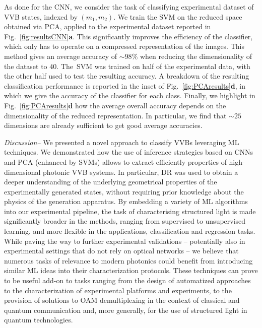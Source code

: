 \documentclass[
	aps, prl, superscriptaddress, twocolumn,
	10pt
	floatfix, 
    nofootinbib,
	tightenlines
]{revtex4-1}
\begin{document}
As done for the CNN, we consider the task of classifying experimental dataset of \ac{VVB} states, indexed by $(m_1,m_2)$. 
We train the \ac{SVM} on the reduced space obtained via {\ac{PCA}}, applied to the experimental dataset reported in Fig.~\ref{fig:resultsCNN}{\bf a}. This significantly improves the efficiency of the classifier, which only has to operate on a compressed representation of the images.
This method gives an average accuracy of $\sim98\%$ when reducing the dimensionality of the dataset to $40$.
The~\ac{SVM} was trained on half of the experimental data, with the other half used to test the resulting accuracy. A breakdown of the resulting classification performance is reported in the inset of Fig.~\ref{fig:PCAresults}{\bf d}, in which we give the accuracy of the classifier for each class.
Finally, we highlight in Fig.~\ref{fig:PCAresults}{\bf d} how the average overall accuracy depends on the dimensionality of the reduced representation. In particular, we find that $\sim 25$ dimensions are already sufficient to get good average accuracies.


\textit{Discussion--} We presented a novel approach to classify \acp{VVB} leveraging ML techniques. We demonstrated how the use of inference strategies based on CNNs and PCA (enhanced by SVMs) allows to extract efficiently properties of high-dimensional photonic {\ac{VVB}} systems.
In particular, DR was used to obtain a deeper understanding of the underlying geometrical properties of the experimentally generated states, without requiring prior knowledge about the physics of the generation apparatus.
By embedding a variety of {\ac{ML}} algorithms into our experimental pipeline, the task of characterising structured light is made significantly broader in the methods, ranging from supervised to unsupervised learning, and more flexible in the applications, classification and regression tasks.
While paving the way to further experimental validations -- potentially also in experimental settings that do not rely on optical networks -- we believe that numerous tasks of relevance to modern photonics could benefit from introducing similar {\ac{ML}} ideas into their characterization protocols. These techniques can prove to be useful add-on to tasks ranging from the design of automatized approaches to the characterization of experimental platforms and experiments, to the provision of solutions to OAM demultiplexing in the context of classical and quantum communication and, more generally, for the use of structured light in quantum technologies.
\end{document}
